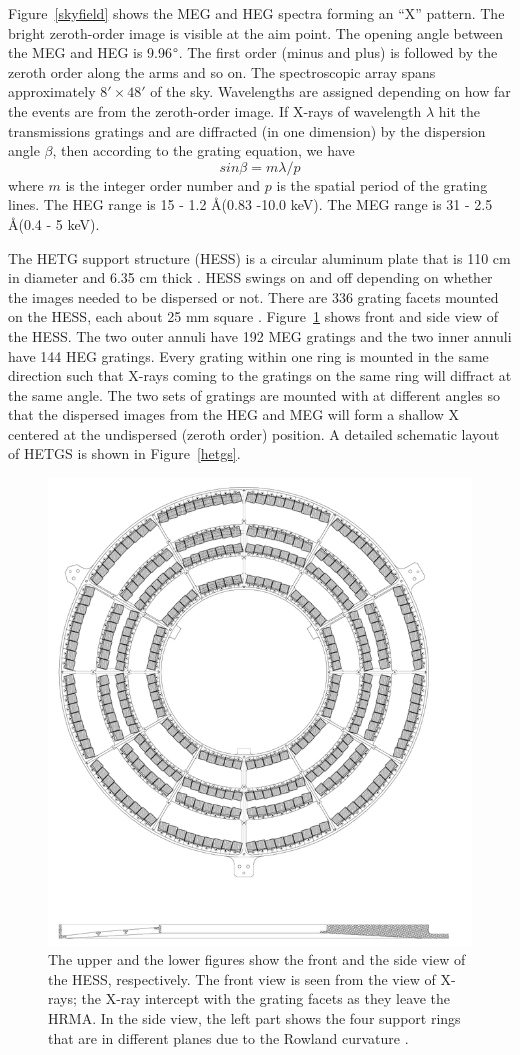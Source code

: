 Figure~\ref{skyfield} shows the MEG and HEG spectra forming an ``X'' pattern. The bright zeroth-order image is visible at the aim point. The opening angle between the MEG and HEG is 9.96$\degree$. The first order (minus and plus) is followed by the zeroth order along the arms and so on. The spectroscopic array spans approximately $8'\times 48'$ of the sky. Wavelengths are assigned depending on how far the events are from the zeroth-order image. If X-rays of wavelength $\lambda$ hit the transmissions gratings and are diffracted (in one dimension) by the dispersion angle $\beta$, then according to the grating equation, we have
\begin{equation}
    sin\beta = m\lambda/p
\end{equation}
where $m$ is the integer order number and $p$ is the spatial period of the grating lines.
The HEG range is 15 - 1.2 \AA (0.83 -10.0 keV). The MEG range is 31 - 2.5 \AA (0.4 - 5 keV).\par

The HETG support structure (HESS) is a circular aluminum plate that is 110 cm in diameter and 6.35 cm thick \citep{ChandraMSFC}. HESS swings on and off depending on whether the images needed to be dispersed or not. There are 336 grating facets mounted on the HESS, each about 25 mm square \citep{ChandraMSFC}. Figure~\ref{hess} shows front and side view of the HESS. The two outer annuli have 192 MEG gratings and the two inner annuli have 144 HEG gratings. Every grating within one ring is mounted in the same direction such that X-rays coming to the gratings on the same ring will diffract at the same angle. The two sets of gratings are mounted with at different angles so that the dispersed images from the HEG and MEG will form a shallow X centered at the undispersed (zeroth order) position. A detailed schematic layout of HETGS is shown in Figure~\ref{hetgs}.\par 


\begin{figure}
    \centering
    \includegraphics[width = 0.5\linewidth]{Chapters/Figures/hess.png}
    \caption{The upper and the lower figures show the front and the side view of the HESS, respectively. The front view is seen from the view of X-rays; the X-ray intercept with the grating facets as they leave the HRMA. In the side view, the left part shows the four support rings that are in different planes due to the Rowland curvature \citep{ChandraMSFC}.}
    \label{hess}
\end{figure}

